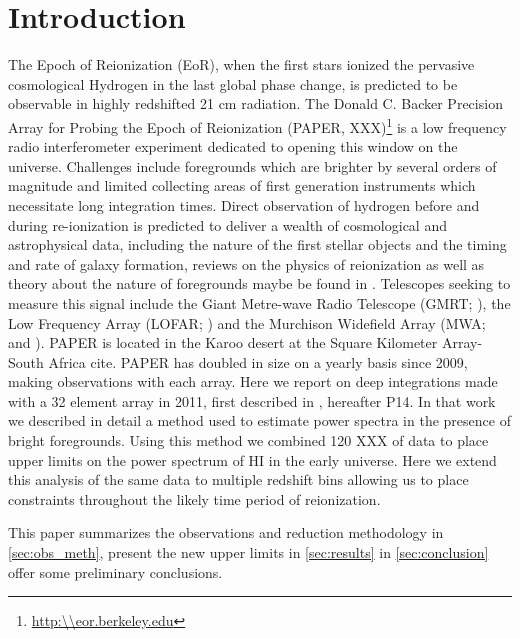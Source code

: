 \documentclass[preprint]{aastex}
\begin{document}
\section{Introduction}
The Epoch of Reionization (EoR), when the first stars ionized the pervasive cosmological Hydrogen in the last global phase change, is predicted to be observable in highly redshifted 21 cm radiation.  The Donald C. Backer Precision Array for Probing the Epoch of Reionization (PAPER, XXX)\footnote{\url{http:\\eor.berkeley.edu}} is a low frequency radio interferometer experiment dedicated to opening this window on the universe.  Challenges include foregrounds which are brighter by several orders of magnitude and limited collecting areas of first generation instruments which necessitate long integration times. Direct observation of hydrogen before and during re-ionization is predicted to deliver a wealth of cosmological and astrophysical data, including the nature of the first stellar objects and the timing and rate of galaxy formation, reviews on the physics of reionization as well as theory about the nature of foregrounds maybe be found in \citet{Furlanetto:2006p2267,Morales:2010p8093,Pritchard:2012p9555}.
Telescopes seeking to measure this signal include the Giant Metre-wave Radio Telescope (GMRT; \cite{Paciga:2013p9943}), the Low Frequency Array (LOFAR; \cite{Yatawatta:2013p9699}) and the Murchison Widefield Array (MWA; \cite{Bowman:2013p9950} and \cite{Tingay:2013p9022}). PAPER is located in the Karoo desert at the Square Kilometer Array-South Africa cite. PAPER has doubled in size on a yearly basis since 2009, making observations with each array.  Here we report on deep integrations made with a 32 element array in 2011, first described in \cite{Parsons:2013p9876}, hereafter P14.  In that work we described in detail a method used to estimate power spectra in the presence of bright foregrounds. Using this method we combined 120 XXX of data to place upper limits on the power spectrum of HI in the early universe. Here we extend this analysis of the same data to  multiple redshift bins allowing us to place constraints throughout the likely time period of reionization.

This paper summarizes the observations and reduction methodology in \ref{sec:obs_meth}, present the new upper limits in \ref{sec:results} in \ref{sec:conclusion} offer some preliminary conclusions.



%
\end{document}
